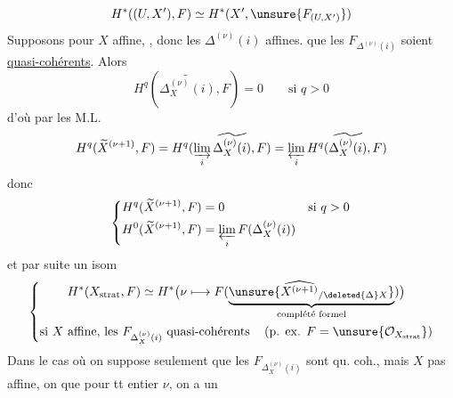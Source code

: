 \[
H^*((U,X'),F)\simeq H^*(X',\unsure{F_{(U,X')}})
\]
Supposons pour  $X$ affine, , donc les $\Delta^{(\nu)}(i)$ affines.  que les $F_{\Delta^{(\nu)}(i)}$ soient \uline{quasi-cohérents}. Alors 
\[
H^q(\widetilde{\Delta_X^{(\nu)}(i)},F)=0\qquad\text{si }q>0
\]
d'où par les  M.L.
\[
H^q(\widetilde X^{(\nu+1)},F)
=H^q(\varinjlim_i\widetilde{\Delta_X^{(\nu)}(i)},F)
=\varprojlim_i H^q(\widetilde{\Delta_X^{(\nu)}(i)},F)
\]
donc
\[
\left\{\begin{aligned}
H^q(\widetilde X^{(\nu+1)},F)&=0&&\text{si }q>0\\
H^0(\widetilde X^{(\nu+1)},F)&=\varprojlim_i F(\Delta_X^{(\nu)}(i))
\end{aligned}\right.
\]
et par suite un isom 
\[
\left\{\begin{gathered}
H^*(X_{\mathrm{strat}},F)\simeq
H^*\bigl(\nu\longmapsto F(\underbrace{\unsure{\widehat{X^{(\nu+1)}}_{/\deleted{\Delta}X}}}_{\text{complété formel}})\bigr)\\
\text{si $X$ affine, les $F_{\Delta_X^{(\nu)}(i)}$ quasi-cohérents}\quad
\left(\text{p. ex. }F=\unsure{\mathcal O_{X_{\mathrm{strat}}}}\right)
\end{gathered}\right.
\]
Dans le cas où on suppose seulement que les $F_{\Delta_X^{(\nu)}(i)}$ sont qu. coh., mais $X$ pas  affine, on  que pour tt entier $\nu$, on a un
